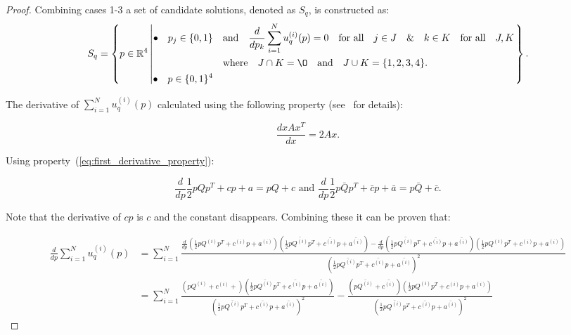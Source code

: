 \documentclass[10pt]{article}
\begin{document}
\begin{proof}
    Combining cases 1-3 a set of candidate solutions, denoted as \(S_q\), is
    constructed as: {\scriptsize
    \begin{equation*}
        S_q =
        \left\{p \in \mathbb{R} ^ 4 \left|
            \begin{aligned}
                \bullet\quad p_j \in \{0, 1\} & \quad \text{and} \quad \frac{d}{dp_k}
                \sum\limits_{i=1} ^ N  u_q^{(i)}(p) = 0
                \quad \text{for all} \quad j \in J \quad \&  \quad k \in K  \quad \text{for all} \quad J, K \\
                & \quad \text{where} \quad J \cap K = \O \quad
                \text{and} \quad J \cup K = \{1, 2, 3, 4\}.\\
                \bullet\quad  p \in \{0, 1\} ^ 4
            \end{aligned}\right.
        \right\}.
    \end{equation*}}

    The derivative of \(\sum\limits_{i=1} ^ N  u_q^{(i)}(p)\) calculated using
    the following property (see~\cite{Abadir2005} for details):

    \begin{equation}\label{eq:first_derivative_property}
    \frac{d x A x^T}{dx} =  2Ax.
    \end{equation}

    Using property~(\ref{eq:first_derivative_property}):

    \begin{equation}\label{eq:quadratics_derivatives}
    \frac{d}{dp} \frac{1}{2}pQp^T + cp + a = pQ + c \text{ and } \frac{d}{dp} \frac{1}{2}p\bar{Q}p^T + \bar{c}p + \bar{a} = p\bar{Q} + \bar{c}.
    \end{equation}

    Note that the derivative of \(cp\) is \(c\) and the constant disappears.
    Combining these it can be proven that:

    \begingroup
    \footnotesize
    \begin{align*}
    \frac{d}{dp} \sum\limits_{i=1} ^ N  u_q^{(i)}(p) & = \sum\limits_{i=1} ^ N \frac{\frac{d}{dp}(\frac{1}{2}pQ^{(i)}p^T + c^{(i)}p + a^{(i)} )(\frac{1}{2}p\bar{Q^{(i)}}p^T + \bar{c^{(i)}}p + \bar{a^{(i)}}) -
    \frac{d}{dp}(\frac{1}{2}p\bar{Q^{(i)}}p^T + \bar{c^{(i)}}p + \bar{a^{(i)}})(\frac{1}{2}pQ^{(i)}p^T + c^{(i)}p + a^{(i)})}{(\frac{1}{2}p\bar{Q^{(i)}}p^T + \bar{c^{(i)}}p + \bar{a^{(i)}})^2} \\
    & = \sum\limits_{i=1} ^ N \frac{(pQ^{(i)} + c^{(i)} +)(\frac{1}{2}p\bar{Q^{(i)}}p^T + \bar{c^{(i)}}p + \bar{a^{(i)}})}{(\frac{1}{2}p\bar{Q^{(i)}}p^T + \bar{c^{(i)}}p + \bar{a^{(i)}})^2} -
     \frac{(p\bar{Q^{(i)}}+ \bar{c^{(i)}})(\frac{1}{2}pQ^{(i)}p^T + c^{(i)}p + a^{(i)})}{(\frac{1}{2}p\bar{Q^{(i)}}p^T + \bar{c^{(i)}}p + \bar{a^{(i)}})^2}
    \end{align*}
    \endgroup


\end{proof}
\end{document}
